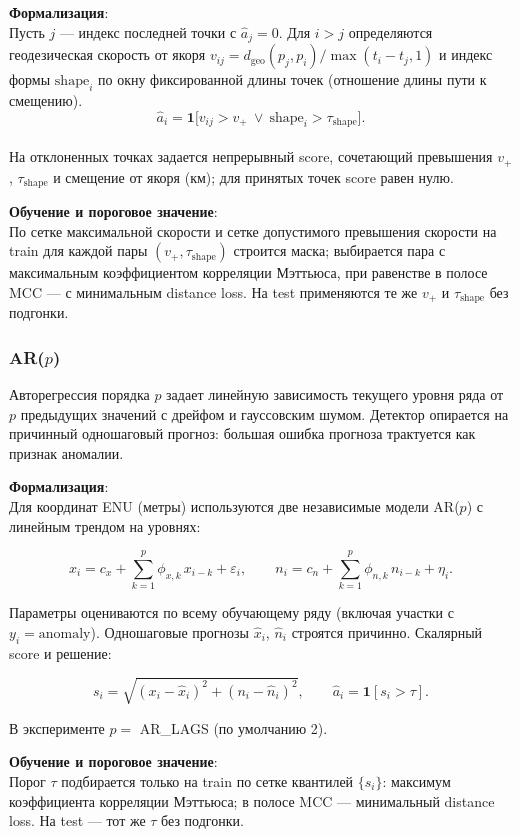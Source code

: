 \documentclass[a4paper,12pt]{report}
\begin{document}
	\textbf{Формализация}:\\
	Пусть $j$ — индекс последней точки с $\hat a_j=0$. Для $i>j$ определяются геодезическая скорость от якоря
	$v_{ij}=d_{\mathrm{geo}}(p_j,p_i)/\max(t_i-t_j,1)$ и индекс формы $\mathrm{shape}_i$ по окну фиксированной длины точек (отношение длины пути к смещению).\\
	$$\hat a_i=\mathbf{1}\bigl[v_{ij}>v_+\ \lor\ \mathrm{shape}_i>\tau_{\mathrm{shape}}\bigr].$$\\
	На отклоненных точках задается непрерывный score, сочетающий превышения $v_+$, $\tau_{\mathrm{shape}}$ и смещение от якоря (км); для принятых точек score равен нулю.

	\textbf{Обучение и пороговое значение}:\\
	По сетке максимальной скорости и сетке допустимого превышения скорости на train для каждой пары $(v_+,\tau_{\mathrm{shape}})$ строится маска; выбирается пара с максимальным коэффициентом корреляции Мэттьюса, при равенстве в полосе MCC — с минимальным distance loss. На test применяются те же $v_+$ и $\tau_{\mathrm{shape}}$ без подгонки.


	\subsubsection{AR($p$)}
	Авторегрессия порядка $p$ задает линейную зависимость текущего уровня ряда от $p$ предыдущих значений с дрейфом и гауссовским шумом. Детектор опирается на причинный одношаговый прогноз: большая ошибка прогноза трактуется как признак аномалии.

	\textbf{Формализация}:\\
	Для координат ENU (метры) используются две независимые модели AR($p$) с линейным трендом на уровнях:

	$$
	x_i = c_x + \sum_{k=1}^{p}\phi_{x,k}\, x_{i-k} + \varepsilon_i, \qquad
	n_i = c_n + \sum_{k=1}^{p}\phi_{n,k}\, n_{i-k} + \eta_i.
	$$

	Параметры оцениваются по всему обучающему ряду (включая участки с $y_i=\mathrm{anomaly}$). Одношаговые прогнозы $\hat x_i$, $\hat n_i$ строятся причинно. Скалярный score и решение:

	$$
	s_i = \sqrt{(x_i-\hat x_i)^2+(n_i-\hat n_i)^2}, \qquad \hat a_i=\mathbf{1}[s_i>\tau].
	$$

	В эксперименте $p=$ AR\_LAGS (по умолчанию 2).

	\textbf{Обучение и пороговое значение}:\\
	Порог $\tau$ подбирается только на train по сетке квантилей $\{s_i\}$: максимум коэффициента корреляции Мэттьюса; в полосе MCC — минимальный distance loss. На test — тот же $\tau$ без подгонки.
\end{document}
